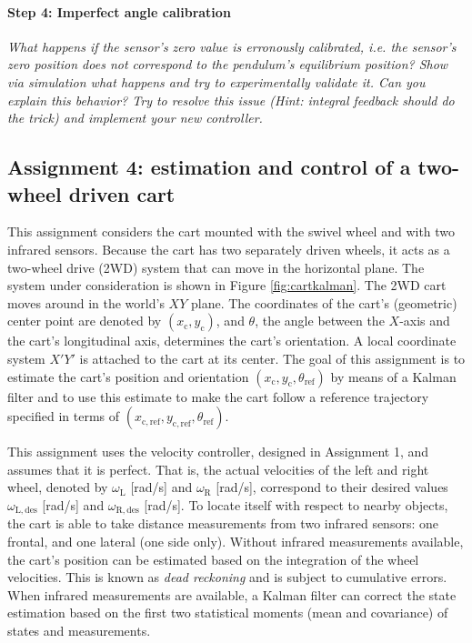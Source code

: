 \documentclass[10pt,a4paper]{article}
\begin{document}
\paragraph{Step 4: Imperfect angle calibration} \textit{What happens if the sensor's zero value is erronously calibrated, i.e. the sensor's zero position does not correspond to the pendulum's equilibrium position? Show via simulation what happens and try to experimentally validate it. Can you explain this behavior? Try to resolve this issue (Hint: integral feedback should do the trick) and implement your new controller.}

\subsection{Assignment 4: estimation and control of a two-wheel driven cart}
This assignment considers the cart mounted with the swivel wheel and with two infrared sensors. Because the cart has two separately driven wheels, it acts as a two-wheel drive (2WD) system that can move in the horizontal plane.
The system under consideration is shown in Figure \ref{fig:cartkalman}. The 2WD cart moves around in the world's $XY$ plane. The coordinates of the cart's (geometric) center point are denoted by $(x_{\mathrm{c}},y_{\mathrm{c}})$, and $\theta$, the angle between the $X$-axis and the cart's longitudinal axis, determines the cart's orientation. A local coordinate system $X'Y'$ is attached to the cart at its center. The goal of this assignment is to estimate the cart's position and orientation $(x_{\mathrm{c}},y_{\mathrm{c}},\theta_{\mathrm{ref}})$ by means of a Kalman filter and to use this estimate to make the cart follow a reference trajectory specified in terms of $(x_{\mathrm{c,ref}},y_{\mathrm{c,ref}},\theta_{\mathrm{ref}})$.

This assignment uses the velocity controller, designed in Assignment 1, and assumes that it is perfect. That is, the actual velocities of the left and right wheel, denoted by $\omega_{\mathrm{L}}$ [rad/s] and $\omega_{\mathrm{R}}$ [rad/s], correspond to their desired values $\omega_{\mathrm{L,des}}$ [rad/s] and $\omega_{\mathrm{R,des}}$ [rad/s].
To locate itself with respect to nearby objects, the cart is able to take distance measurements from two infrared sensors: one frontal, and one lateral (one side only).
Without infrared measurements available, the cart's position can be  estimated based on the integration of the wheel velocities. This is known as  \textit{dead reckoning} and is subject to cumulative errors. When infrared measurements are available, a Kalman filter can correct the state estimation based on the first two statistical moments (mean and covariance) of states and measurements.
\end{document}
